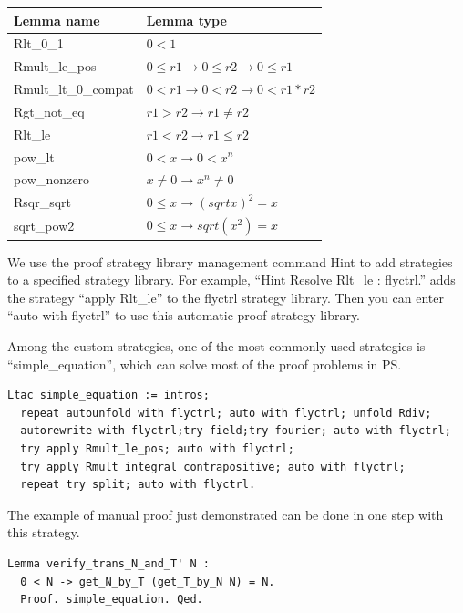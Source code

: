 \documentclass{article} %
\numberwithin{equation}{section} %
\begin{document}
\begin{center}
\begin{tabular}{|l|l|}
\hline
\textbf{Lemma name} & \textbf{Lemma type} \\
\hline
Rlt\_0\_1					& $0 < 1													$ \\
Rmult\_le\_pos              & $0 \le r1 \rightarrow 0 \le r2 \rightarrow 0 \le r1      	$ \\ 
Rmult\_lt\_0\_compat        & $0 < r1 \rightarrow 0 < r2 \rightarrow 0 < r1 * r2   		$ \\ 
Rgt\_not\_eq                & $r1 > r2 \rightarrow r1 \ne r2                			$ \\
Rlt\_le                     & $r1 < r2 \rightarrow r1 \le r2                			$ \\ 
pow\_lt                    	& $0 < x \rightarrow 0 < x ^ n                 				$ \\ 
pow\_nonzero               	& $x \ne 0 \rightarrow x ^ n \ne 0               			$ \\
Rsqr\_sqrt                 	& $0 \le x \rightarrow (sqrt x)^2 = x            			$ \\ 
sqrt\_pow2                 	& $0 \le x \rightarrow sqrt (x ^ 2) = x         			$ \\ 
\hline
\end{tabular}
\label{tab:reals_lemmas}
\end{center}

We use the proof strategy library management command Hint to add strategies to a specified strategy library. 
For example, ``Hint Resolve Rlt\_le : flyctrl.'' adds the strategy ``apply Rlt\_le'' to the flyctrl strategy library. 
Then you can enter ``auto with flyctrl'' to use this automatic proof strategy library.

Among the custom strategies, one of the most commonly used strategies is ``simple\_equation'', which can solve most of the proof problems in PS.
\begin{verbatim}
Ltac simple_equation := intros;
  repeat autounfold with flyctrl; auto with flyctrl; unfold Rdiv;
  autorewrite with flyctrl;try field;try fourier; auto with flyctrl;
  try apply Rmult_le_pos; auto with flyctrl;
  try apply Rmult_integral_contrapositive; auto with flyctrl;
  repeat try split; auto with flyctrl.
\end{verbatim}

The example of manual proof just demonstrated can be done in one step with this strategy.
\begin{verbatim}
Lemma verify_trans_N_and_T' N : 
  0 < N -> get_N_by_T (get_T_by_N N) = N.
  Proof. simple_equation. Qed.
\end{verbatim}
\end{document}
